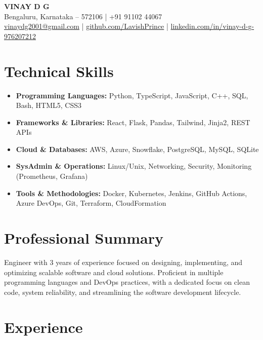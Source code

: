 \documentclass[a4paper,11pt]{article}
\begin{document}
\begin{center}
    \textbf{\Large VINAY D G} \\
    Bengaluru, Karnataka – 572106 \quad | \quad +91 91102 44067 \\
    \href{mailto:vinaydg2001@gmail.com}{vinaydg2001@gmail.com} \quad | \quad \href{https://github.com/LavishPrince}{github.com/LavishPrince} \quad | \quad \href{https://www.linkedin.com/in/vinay-d-g-976207212/}{linkedin.com/in/vinay-d-g-976207212}
\end{center}

\section*{Technical Skills}
\begin{itemize}[leftmargin=0.15in, label={}, nosep]
    \item \textbf{Programming Languages:} Python, TypeScript, JavaScript, C++, SQL, Bash, HTML5, CSS3
    \item \textbf{Frameworks \& Libraries:} React, Flask, Pandas, Tailwind, Jinja2, REST APIs
    \item \textbf{Cloud \& Databases:} AWS, Azure, Snowflake, PostgreSQL, MySQL, SQLite
    \item \textbf{SysAdmin \& Operations:} Linux/Unix, Networking, Security, Monitoring (Prometheus, Grafana)
    \item \textbf{Tools \& Methodologies:} Docker, Kubernetes, Jenkins, GitHub Actions, Azure DevOps, Git, Terraform, CloudFormation
\end{itemize}

\section*{Professional Summary}
Engineer with 3 years of experience focused on designing, implementing, and optimizing scalable software and cloud solutions. Proficient in multiple programming languages and DevOps practices, with a dedicated focus on clean code, system reliability, and streamlining the software development lifecycle.

\section*{Experience}
\end{document}
